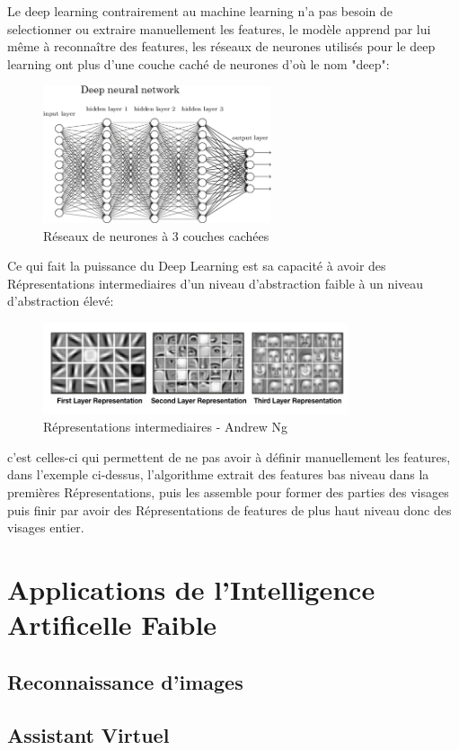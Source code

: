 Le deep learning contrairement au machine learning n'a pas besoin de selectionner 
ou extraire manuellement les features, le modèle apprend par lui même à reconnaître 
des features, les réseaux de neurones utilisés pour le deep learning 
ont plus d'une couche caché de neurones d'où le nom "deep": \newline

\begin{figure}[!h]
    \centering
    \includegraphics[width=0.6\textwidth]{Images/deepnn}
    \caption{Réseaux de neurones à 3 couches cachées}
	\label{fig:deepneuralnetwork}
\end{figure}

Ce qui fait la puissance du Deep Learning est sa capacité à avoir des Répresentations
intermediaires d'un niveau d'abstraction faible à un niveau d'abstraction élevé:

\begin{figure}[!h]
    \centering
    \includegraphics[width=0.8\textwidth]{Images/layeredrepresentation}
    \caption{Répresentations intermediaires - Andrew Ng}
	\label{fig:deepnnrepresentation}
\end{figure}

c'est celles-ci qui permettent de ne pas avoir à définir manuellement les features, 
dans l'exemple ci-dessus, l'algorithme extrait des features bas niveau dans la 
premières Répresentations, puis les assemble pour former des parties des 
visages puis finir par avoir des Répresentations de features de plus 
haut niveau donc des visages entier. \newline


\chapter{Applications de l'Intelligence Artificelle Faible}
\section{Reconnaissance d'images}
\section{Assistant Virtuel}

